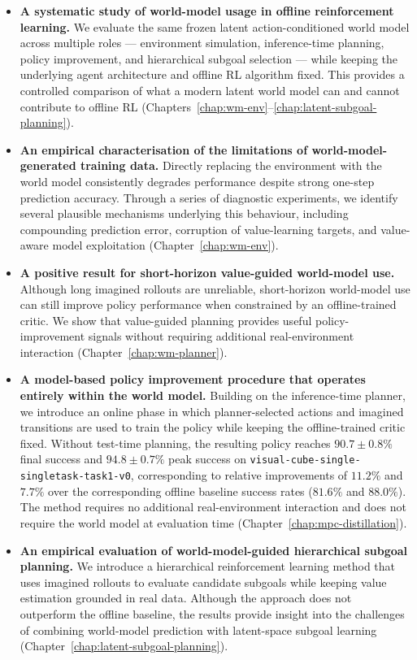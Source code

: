 \begin{itemize}

\item \textbf{A systematic study of world-model usage in offline reinforcement learning.}
We evaluate the same frozen latent action-conditioned world model across
multiple roles --- environment simulation, inference-time planning, policy
improvement, and hierarchical subgoal selection --- while keeping the underlying
agent architecture and offline RL algorithm fixed. This provides a controlled
comparison of what a modern latent world model can and cannot contribute to
offline RL
(Chapters~\ref{chap:wm-env}--\ref{chap:latent-subgoal-planning}).

\item \textbf{An empirical characterisation of the limitations of world-model-generated training data.}
Directly replacing the environment with the world model consistently degrades performance despite strong one-step prediction accuracy. Through a series of diagnostic experiments, we identify several plausible mechanisms underlying this behaviour, including compounding prediction error, corruption of value-learning targets, and value-aware model exploitation
(Chapter~\ref{chap:wm-env}).

\item \textbf{A positive result for short-horizon value-guided world-model use.} Although long imagined rollouts are unreliable, short-horizon world-model use can still improve policy performance when constrained by an offline-trained critic. We show that value-guided planning provides useful policy-improvement signals without requiring additional real-environment interaction (Chapter~\ref{chap:wm-planner}).

\item \textbf{A model-based policy improvement procedure that operates entirely within the world model.}
Building on the inference-time planner, we introduce an online phase in which planner-selected actions and imagined transitions are used to train the policy while keeping the offline-trained critic fixed. Without test-time planning, the resulting policy reaches
$90.7 \pm 0.8\%$ final success and
$94.8 \pm 0.7\%$ peak success on
\texttt{visual-cube-single-singletask-task1-v0},
corresponding to relative improvements of $11.2\%$ and $7.7\%$ over the corresponding offline baseline success rates ($81.6\%$ and $88.0\%$). The method requires no additional real-environment interaction and does not require the world model at evaluation time
(Chapter~\ref{chap:mpc-distillation}).

\item \textbf{An empirical evaluation of world-model-guided hierarchical subgoal planning.}
We introduce a hierarchical reinforcement learning method that uses imagined rollouts to evaluate candidate subgoals while keeping value estimation grounded in real data. Although the approach does not outperform the offline baseline, the results provide insight into the challenges of combining world-model prediction with latent-space subgoal learning
(Chapter~\ref{chap:latent-subgoal-planning}).

\end{itemize}
